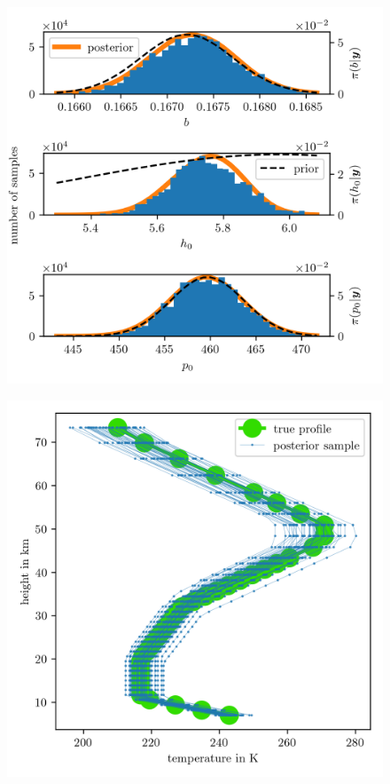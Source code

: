 \begin{figure}[ht!]
	\centering
	\includegraphics{PHdPTPost4.png}
	\caption[]{}
	\label{fig:PostHistTT4}
\end{figure}

\begin{figure}[ht!]
	\centering
	\includegraphics{TempPostMeanSigm.png}
	\caption[]{}
	\label{fig:TempPost}
\end{figure}

